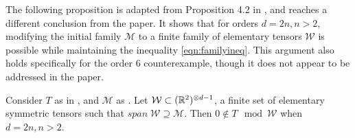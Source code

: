 \documentclass[../Lael_John_MasterThesis_Draft.tex]{subfiles}
\begin{document}
The following proposition is adapted from Proposition 4.2 in \cite{wang_lower_2023}, and reaches a different conclusion from the paper. It shows that for orders $d = 2n, n > 2$, modifying the initial family $\mathcal{M}$ to a finite family of elementary tensors $\mathcal{W}$ is possible while maintaining the inequality \cref{eqn:familyineq}. This argument also holds specifically for the order $6$ counterexample, though it does not appear to be addressed in the paper. 
\begin{proposition}\label{prop:modifyingfamily}
    Consider $T$ as in , and $\mathcal{M}$ as . Let $\mathcal{W} \subset (\mathbb{R}^2)^{\otimes d-1}$, a finite set of elementary symmetric tensors such that $span \;\mathcal{W} \supseteq \mathcal{M}$. Then $0 \notin T \mod \mathcal{W}$ when $d = 2n, n > 2$.
\end{proposition}
\end{document}
